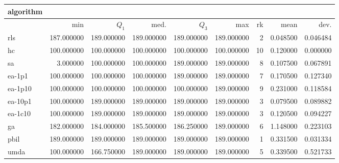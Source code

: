 \begin{tabular}{@{}l*{5}{>{{}}N{3}{0}}>{{}}N{2}{0}N{1}{3}N{1}{3}@{}}
\toprule
{algorithm} &  &  \\
\midrule
& {min} & {$Q_1$} & {med.} & {$Q_3$} & {max} & {rk} & {mean} & {dev.} \\
\midrule
rls & 187.000000 & {\color{blue}} 189.000000 & {\color{blue}} 189.000000 & {\color{blue}} 189.000000 & {\color{blue}} 189.000000 & 2 & 0.048500 & 0.046484 \\
 hc & 100.000000 & 100.000000 & 100.000000 & 100.000000 & 100.000000 & 10 & 0.120000 & 0.000000 \\
 sa & 3.000000 & 100.000000 & 100.000000 & {\color{blue}} 189.000000 & {\color{blue}} 189.000000 & 8 & 0.107500 & 0.067891 \\
 ea-1p1 & 100.000000 & 100.000000 & 100.000000 & {\color{blue}} 189.000000 & {\color{blue}} 189.000000 & 7 & 0.170500 & 0.127340 \\
 ea-1p10 & 100.000000 & 100.000000 & 100.000000 & 100.000000 & {\color{blue}} 189.000000 & 9 & 0.231000 & 0.118584 \\
 ea-10p1 & 100.000000 & {\color{blue}} 189.000000 & {\color{blue}} 189.000000 & {\color{blue}} 189.000000 & {\color{blue}} 189.000000 & 3 & 0.079500 & 0.089882 \\
 ea-1c10 & 100.000000 & {\color{blue}} 189.000000 & {\color{blue}} 189.000000 & {\color{blue}} 189.000000 & {\color{blue}} 189.000000 & 3 & 0.120500 & 0.094227 \\
 ga & 182.000000 & 184.000000 & 185.500000 & 186.250000 & {\color{blue}} 189.000000 & 6 & 1.148000 & 0.223103 \\
 pbil & {\color{blue}} 189.000000 & {\color{blue}} 189.000000 & {\color{blue}} 189.000000 & {\color{blue}} 189.000000 & {\color{blue}} 189.000000 & 1 & 0.331500 & 0.031334 \\
 umda & 100.000000 & 166.750000 & {\color{blue}} 189.000000 & {\color{blue}} 189.000000 & {\color{blue}} 189.000000 & 5 & 0.339500 & 0.521733 \\
 \bottomrule
\end{tabular}
